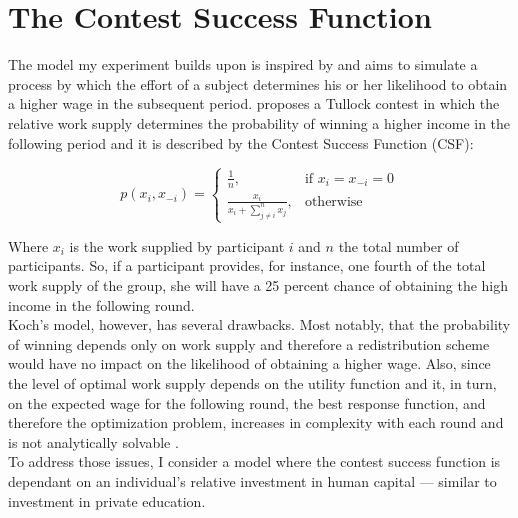 \chapter{The Contest Success Function}
\label{ch:model}
\thispagestyle{fancy}

The model my experiment builds upon is inspired by \cite{koch2017} and aims to simulate a process by which the effort of a subject determines his or her likelihood to obtain a higher wage in the subsequent period. \cite{koch2017} proposes a Tullock contest in which the relative work supply determines the probability of winning a higher income in the following period and it is described by the Contest Success Function (CSF):

\begin{equation}
    p(x_i,x_{-i}) =
\begin{cases}
    \frac{1}{n},& \text{if } x_i = x_{-i} = 0\\
    \frac{x_i}{x_i + \sum_{j\neq i}^n x_{j}},              & \text{otherwise}
\end{cases}
\label{eq:csf}    
\end{equation}

\hfill \break

Where $x_i$ is the work supplied by participant $i$ and $n$ the total number of participants. So, if a participant provides, for instance, one fourth of the total work supply of the group, she will have a 25 percent chance of obtaining the high income in the following round.\\

Koch's model, however, has several drawbacks. Most notably, that the probability of winning depends only on work supply and therefore a redistribution scheme would have no impact on the likelihood of obtaining a higher wage. 
Also, since the level of optimal work supply depends on the utility function and it, in turn, on the expected wage for the following round, the best response function, and therefore the optimization problem, increases in complexity with each round and is not  analytically solvable \citep{koch2017}.\\ 

To address those issues, I consider a model where the contest success function is dependant on an individual's relative investment in human capital –– similar to investment in private education.\\ 

